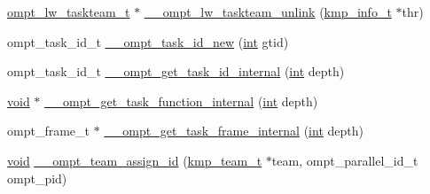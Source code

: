 \begin{DoxyCompactItemize}
\item 
\hyperlink{ompt-internal_8h_a9efdb170346e988130296a7bb0cb861c}{ompt\-\_\-lw\-\_\-taskteam\-\_\-t} $\ast$ \hyperlink{ompt-specific_8c_a08e5e3e94237b2bf04a271d942936eef}{\-\_\-\-\_\-ompt\-\_\-lw\-\_\-taskteam\-\_\-unlink} (\hyperlink{kmp_8h_a194859801fe16b326efe34501a37c30a}{kmp\-\_\-info\-\_\-t} $\ast$thr)
\item 
ompt\-\_\-task\-\_\-id\-\_\-t \hyperlink{ompt-specific_8c_a00dc76b44da40dee97e27a16c472e0ca}{\-\_\-\-\_\-ompt\-\_\-task\-\_\-id\-\_\-new} (\hyperlink{ittnotify__static_8h_a8b8dcd723308a8cb5d84277c7a3fff70}{int} gtid)
\item 
ompt\-\_\-task\-\_\-id\-\_\-t \hyperlink{ompt-specific_8c_a18b0095c57b9a12664adf9ac87a52062}{\-\_\-\-\_\-ompt\-\_\-get\-\_\-task\-\_\-id\-\_\-internal} (\hyperlink{ittnotify__static_8h_a8b8dcd723308a8cb5d84277c7a3fff70}{int} depth)
\item 
\hyperlink{ittnotify__static_8h_af941d56e55e3c5465135b60c4d6343ed}{void} $\ast$ \hyperlink{ompt-specific_8c_a8c743629ff6dbc64481588682dcf3fd4}{\-\_\-\-\_\-ompt\-\_\-get\-\_\-task\-\_\-function\-\_\-internal} (\hyperlink{ittnotify__static_8h_a8b8dcd723308a8cb5d84277c7a3fff70}{int} depth)
\item 
ompt\-\_\-frame\-\_\-t $\ast$ \hyperlink{ompt-specific_8c_af8e9ca4aa0c4492074f01f5c67f6da51}{\-\_\-\-\_\-ompt\-\_\-get\-\_\-task\-\_\-frame\-\_\-internal} (\hyperlink{ittnotify__static_8h_a8b8dcd723308a8cb5d84277c7a3fff70}{int} depth)
\item 
\hyperlink{ittnotify__static_8h_af941d56e55e3c5465135b60c4d6343ed}{void} \hyperlink{ompt-specific_8c_a42b74b829cdbf17b033acb9f5e2cdd2b}{\-\_\-\-\_\-ompt\-\_\-team\-\_\-assign\-\_\-id} (\hyperlink{kmp_8h_a95f7a64bda9b774add6c27c4a7b2a143}{kmp\-\_\-team\-\_\-t} $\ast$team, ompt\-\_\-parallel\-\_\-id\-\_\-t ompt\-\_\-pid)
\end{DoxyCompactItemize}


